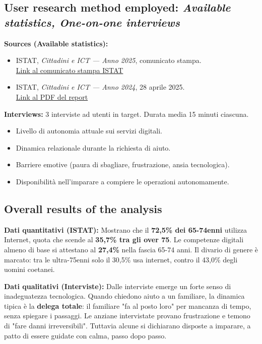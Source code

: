 \documentclass[11pt,a4paper]{article}
\begin{document}
\subsection*{User research method employed: \textit{Available statistics, One-on-one interviews}}
\begin{tcolorbox}[colback=backgroundColor,colframe=borderColor,arc=2mm]
\textbf{Sources (Available statistics):}
\begin{itemize}[leftmargin=*]
  \item ISTAT, \textit{Cittadini e ICT --- Anno 2025}, comunicato stampa.\\
  \href{https://www.istat.it/comunicato-stampa/cittadini-e-ict-anno-2025/}{Link al comunicato stampa ISTAT}
  \item ISTAT, \textit{Cittadini e ICT --- Anno 2024}, 28 aprile 2025.\\
  \href{https://www.istat.it/wp-content/uploads/2025/04/REPORT_CITTADINI-E-ICT_2024.pdf}{Link al PDF del report}
\end{itemize}

\vspace{0.3cm}
\textbf{Interviews:} 3 interviste ad utenti in target. Durata media 15 minuti ciascuna.
\begin{itemize}[leftmargin=*]
  \item Livello di autonomia attuale sui servizi digitali.
  \item Dinamica relazionale durante la richiesta di aiuto.
  \item Barriere emotive (paura di sbagliare, frustrazione, ansia tecnologica).
  \item Disponibilità nell'imparare a compiere le operazioni autonomamente.
\end{itemize}
\end{tcolorbox}

\subsection*{Overall results of the analysis}
\begin{tcolorbox}[colback=backgroundColor,colframe=borderColor,arc=2mm]
\textbf{Dati quantitativi (ISTAT):} Mostrano che il \textbf{72,5\% dei 65-74enni} utilizza Internet, quota che scende al \textbf{35,7\% tra gli over 75}. Le competenze digitali almeno di base si attestano al \textbf{27,4\%} nella fascia 65-74 anni. Il divario di genere è marcato: tra le ultra-75enni solo il 30,5\% usa internet, contro il 43,0\% degli uomini coetanei.

\vspace{0.2cm}
\textbf{Dati qualitativi (Interviste):} Dalle interviste emerge un forte senso di inadeguatezza tecnologica. Quando chiedono aiuto a un familiare, la dinamica tipica è la \textbf{delega totale}: il familiare "fa al posto loro" per mancanza di tempo, senza spiegare i passaggi. Le anziane intervistate provano frustrazione e temono di "fare danni irreversibili". Tuttavia alcune si dichiarano disposte a imparare, a patto di essere guidate con calma, passo dopo passo.
\end{tcolorbox}
\end{document}
